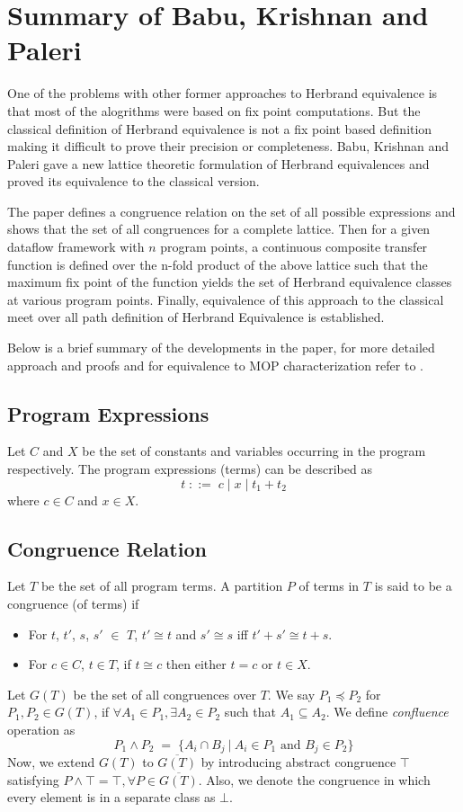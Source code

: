\chapter{Summary of Babu, Krishnan and Paleri}
\label{chap:chapter5}

One of the problems with other former approaches to Herbrand 
equivalence is that most of the alogrithms were based on fix point 
computations. But the classical definition of Herbrand equivalence is 
not a fix point based definition making it difficult to prove their 
precision or completeness. Babu, Krishnan and Paleri \cite{Babu} gave 
a new lattice theoretic formulation of Herbrand equivalences and 
proved its equivalence to the classical version.

The paper defines a congruence relation on the set of all possible 
expressions and shows that the set of all congruences for a complete 
lattice. Then for a given dataflow framework with $n$ program points, 
a continuous composite transfer function is defined over the n-fold 
product of the above lattice such that the maximum fix point of the 
function yields the set of Herbrand equivalence classes at various 
program points. Finally, equivalence of this approach to the 
classical meet over all path definition of Herbrand Equivalence is 
established.

Below is a brief summary of the developments in the paper, for more 
detailed approach and proofs and for equivalence to MOP  
characterization refer to \cite{Babu}.

\section{Program Expressions}

Let $C$ and $X$ be the set of constants and variables occurring in 
the program respectively. The program expressions (terms) can be 
described as 
$$t\; ::=\; c\; |\; x\; |\; t_1 + t_2$$
where $c \in C$ and $x \in X$.

\section{Congruence Relation}
Let $T$ be the set of all program terms. A partition $P$ of terms in $T$ is said to be a congruence (of terms) if 
\begin{itemize}
    \item For $t$, $t'$, $s$, $s'$ $\in$ $T$, $t' \cong t$ and $s' \cong s$ iff $t' + s' \cong t + s$. 
    \item For $c \in C$, $t \in T$, if $t \cong c$ then either $t = c$ or $t \in X$.
\end{itemize}
Let $G(T)$ be the set of all congruences over $T$. We say $P_1 
\preceq P_2$ for $P_1, P_2 \in G(T)$, if 
$\forall A_1 \in P_1, \exists A_2 \in P_2$ such that 
$A_1 \subseteq A_2$. We define \textit{confluence} operation as 
$$P_1 \land P_2\; =\; \{A_i \cap B_j\: |\: A_i \in P_1 \text{ and } B_j \in P_2\}$$
Now, we extend $G(T)$ to $\overline{G(T)}$ by introducing abstract 
congruence $\top$ satisfying 
$P \land \top = \top, \forall P \in \overline{G(T)}$.
Also, we denote the congruence in which every element is in a 
separate class as $\bot$. 

